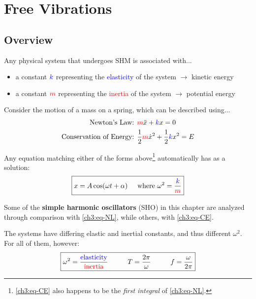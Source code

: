 \documentclass[11pt,letterpaper,titlepage,oneside]{book}
\newcommand{\htab}{\hspace{0.5cm}}
\newcommand{\hhtab}{\htab\htab}
\newcommand{\where}{\htab\text{where }}
\newcommand{\kcol}[1]{\textcolor{blue}{#1}}
\newcommand{\mcol}[1]{\textcolor{red}{#1}}
\begin{document}

\chapter{Free Vibrations}

\section{Overview}
Any physical system that undergoes SHM is associated with...
\begin{itemize}
	\item a constant $\kcol{k}$ representing the \kcol{elasticity} of the system $\longrightarrow$ kinetic energy
	\item a constant $\mcol{m}$ representing the \mcol{inertia} of the system $\longrightarrow$ potential energy
\end{itemize}

Consider the motion of a mass on a spring, which can be described using...
\begin{align}
	\text{Newton's Law: }&
	\mcol{m}\ddot{x} + \kcol{k}x = 0 \label{ch3:eq-NL} \\
	\text{Conservation of Energy: }&
	\frac{1}{2}\mcol{m}\dot{x}^2 + \frac{1}{2}\kcol{k}x^2 = E \label{ch3:eq-CE}
\end{align}

Any equation matching either of the forms above\footnote{\eqref{ch3:eq-CE} also happens to be the \textit{first integral} of  \eqref{ch3:eq-NL}.} automatically has as a solution:
\begin{equation}
\boxed{x = A \cos(\omega t+\alpha)\where\omega^2 = \frac{\kcol{k}}{\mcol{m}}} \label{ch3:eq-SHM-soln}
\end{equation}

Some of the \textbf{simple harmonic oscillators} (SHO) in this chapter are analyzed through comparison with \eqref{ch3:eq-NL}, while others, with \eqref{ch3:eq-CE}.

The systems have differing elastic and inertial constants, and thus different $\omega^2$. For all of them, however:
\begin{equation}
	\boxed{
		\omega^2 = \frac{\kcol{\text{elasticity}}}{\mcol{\text{inertia}}} \hhtab 
		T = \frac{2\pi}{\omega} \hhtab 
		f = \frac{\omega}{2\pi}}
\end{equation}
\end{document}
